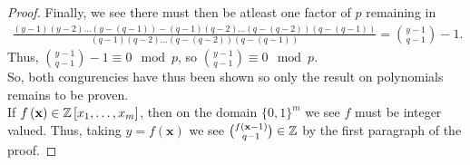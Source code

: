 \begin{proof}
Finally, we see there must then be atleast one factor of \(p\) remaining in
\begin{align*}
	\frac{\left( y-1 \right) \left( y-2 \right) \ldots \left( y-\left( q-1 \right)  \right)  - \left( q-1 \right) \left( q-2 \right) \ldots \left( q-\left( q-2 \right)  \right) \left( q-\left( q-1 \right)  \right)  }{\left( q-1 \right) \left( q-2 \right) \ldots \left( q-\left( q-2 \right)  \right) \left( q-\left( q-1 \right)  \right) } = \binom{y-1}{q-1} - 1
.\end{align*}
Thus, \(\binom{y-1}{q-1} - 1 \equiv 0 \mod p\), so \(\binom{y-1}{q-1}\equiv 0 \mod p\).\\
So, both congurencies have thus been shown so only the result on polynomials remains to be proven.\\
If \(f\left( \textbf{x} \right)  \in \mathbb{Z}\left[ x_1, \ldots, x_{m} \right] \), then on the domain \(\{0, 1\} ^{m}\) we see \(f\) must be integer valued. Thus, taking \(y = f\left( \textbf{x} \right) \) we see \(\binom{f\left( \textbf{x} -1 \right) }{q-1} \in \mathbb{Z}\) by the first paragraph of the proof.
\end{proof}
